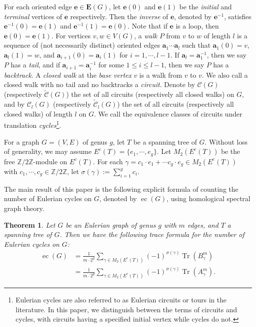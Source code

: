 \documentclass[11pt]{amsart}
\theoremstyle{plain}
\newtheorem{theorem}{Theorem}[section]
\theoremstyle{definition}
\newcommand{\mbbZ}{{\mathbb Z}}
\newcommand{\mcalC}{{\mathcal C}}
\newcommand{\va}{{\mathbf a}}
\newcommand{\ve}{{\mathbf e}}
\newcommand{\vE}{{\mathbf E}}
\DeclareMathOperator{\ec}{\operatorname{ec}}
\DeclareMathOperator{\trace}{\operatorname{Tr}}
\numberwithin{equation}{section}
\begin{document}
For each oriented edge $\ve\in\vE(G)$, let $\ve(0)$ and $\ve(1)$ be the \emph{initial} and \emph{terminal} vertices of $\ve$ respectively. Then the \emph{inverse} of $\ve$, denoted by $\ve^{-1}$, satisfies $\ve^{-1}(0)=\ve(1)$ and $\ve^{-1}(1)=\ve(0)$. Note that if $\ve$ is a loop, then $\ve(0)=\ve(1)$. For vertices $v,w\in V(G)$, a \emph{walk} $P$ from $v$ to $w$ of length $l$ is a sequence of (not necessarily distinct) oriented edges  $\va_1\cdots\va_l$ such that $\va_1(0)=v$, $\va_l(1)=w$, and $\va_{i+1}(0)=\va_{i}(1)$ for $i=1,\cdots,l-1$.  If  $\va_l=\va_1^{-1}$, then we say $P$ has a \emph{tail}, and if $\va_{i+1}=\va_i^{-1}$ for some $1\leq i\leq l-1$, then we say $P$ has a \emph{backtrack}. A \emph{closed walk} at the \emph{base vertex} $v$ is a walk from $v$ to $v$. We also call a closed walk with no tail and no backtracks a \emph{circuit}. Denote by  $\mcalC(G)$ (respectively $\widetilde{\mcalC}(G)$) the set of all circuits (respectively all closed walks) on $G$, and by $\mcalC_l(G)$ (respectively $\widetilde{\mcalC}_l(G)$) the set of all circuits (respectively all closed walks) of length $l$ on $G$. We call the equivalence classes of circuits under translation \emph{cycles}\footnote{Eulerian cycles are also referred to as Eulerian circuits or tours in the literature. In this paper, we distinguish between the terms of circuits and cycles, with circuits having a specified initial vertex while cycles do not.}. 
 




For a graph $G=(V,E)$ of genus $g$, let $T$ be a spanning tree of $G$. Without loss of generality, we may assume $E^c(T) = \{e_1,\cdots,e_g\}$. Let $M_2(E^c(T) )$ be the free $\mbbZ/2\mbbZ$-module on $E^c(T)$. For each $\gamma = c_1\cdot e_1+\cdots c_g\cdot e_g\in M_2(E^c(T) )$ with $c_1,\cdots, c_g\in \mbbZ/2\mbbZ$, let $\sigma(\gamma):=\sum_{i=1}^g c_i$. 

The main result of this paper is the following explicit formula of counting the number of Eulerian cycles on $G$, denoted by $\ec(G)$, using homological spectral graph theory. 

\begin{theorem} \label{T:main}
Let $G$ be an Eulerian graph of genus $g$ with $m$ edges, and $T$ a spanning tree of $G$. Then we have the following trace formula for the number of Eulerian cycles on $G$:
\begin{align*}
\ec(G) &= \frac{1}{m\cdot 2^g}\sum_{\gamma\in M_2(E^c(T))}(-1)^{\sigma(\gamma)}\trace\left(B_\gamma^m\right) \\
&= \frac{1}{m\cdot 2^g}\sum_{\gamma\in M_2(E^c(T))}(-1)^{\sigma(\gamma)}\trace\left(A_\gamma^m\right).
\end{align*}
\end{theorem}
\end{document}
